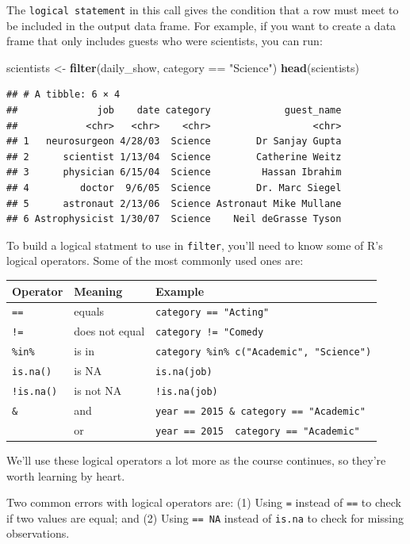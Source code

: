 \documentclass[]{book}
\makeatletter
\newenvironment{Shaded}{\begin{snugshade}}{\end{snugshade}}
\newcommand{\KeywordTok}[1]{\textcolor[rgb]{0.13,0.29,0.53}{\textbf{{#1}}}}
\newcommand{\StringTok}[1]{\textcolor[rgb]{0.31,0.60,0.02}{{#1}}}
\newcommand{\NormalTok}[1]{{#1}}
\newenvironment{kframe}{%
\medskip{}
\setlength{\fboxsep}{.8em}
 \def\at@end@of@kframe{}%
 \ifinner\ifhmode%
  \def\at@end@of@kframe{\end{minipage}}%
  \begin{minipage}{\columnwidth}%
 \fi\fi%
 \def\FrameCommand##1{\hskip\@totalleftmargin \hskip-\fboxsep
 \colorbox{shadecolor}{##1}\hskip-\fboxsep
     \hskip-\linewidth \hskip-\@totalleftmargin \hskip\columnwidth}%
 \MakeFramed {\advance\hsize-\width
   \@totalleftmargin\z@ \linewidth\hsize
   \@setminipage}}%
 {\par\unskip\endMakeFramed%
 \at@end@of@kframe}
\renewenvironment{Shaded}{\begin{kframe}}{\end{kframe}}
\newenvironment{rmdblock}[1]
  {
  \begin{itemize}
  \renewcommand{\labelitemi}{
    \raisebox{-.7\height}[0pt][0pt]{
      {\setkeys{Gin}{width=3em,keepaspectratio}\texttt{[image: images/\#1]}}
    }
  }
  \setlength{\fboxsep}{1em}
  \begin{kframe}
  \item
  }
  {
  \end{kframe}
  \end{itemize}
  }
\newenvironment{rmdwarning}
  {\begin{rmdblock}{warning}}
  {\end{rmdblock}}
\makeatother
\begin{document}
The \texttt{logical\ statement} in this call gives the condition that a
row must meet to be included in the output data frame. For example, if
you want to create a data frame that only includes guests who were
scientists, you can run:

\begin{Shaded}
\begin{Highlighting}[]
\NormalTok{scientists <-}\StringTok{ }\KeywordTok{filter}\NormalTok{(daily_show, category ==}\StringTok{ "Science"}\NormalTok{)}
\KeywordTok{head}\NormalTok{(scientists)}
\end{Highlighting}
\end{Shaded}

\begin{verbatim}
## # A tibble: 6 × 4
##              job    date category             guest_name
##            <chr>   <chr>    <chr>                  <chr>
## 1   neurosurgeon 4/28/03  Science        Dr Sanjay Gupta
## 2      scientist 1/13/04  Science        Catherine Weitz
## 3      physician 6/15/04  Science         Hassan Ibrahim
## 4         doctor  9/6/05  Science        Dr. Marc Siegel
## 5      astronaut 2/13/06  Science Astronaut Mike Mullane
## 6 Astrophysicist 1/30/07  Science    Neil deGrasse Tyson
\end{verbatim}

To build a logical statment to use in \texttt{filter}, you'll need to
know some of R's logical operators. Some of the most commonly used ones
are:

\begin{longtable}[c]{@{}lll@{}}
\toprule
Operator & Meaning & Example\tabularnewline
\midrule
\endhead
\texttt{==} & equals & \texttt{category\ ==\ "Acting"}\tabularnewline
\texttt{!=} & does not equal &
\texttt{category\ !=\ "Comedy}\tabularnewline
\texttt{\%in\%} & is in &
\texttt{category\ \%in\%\ c("Academic",\ "Science")}\tabularnewline
\texttt{is.na()} & is NA & \texttt{is.na(job)}\tabularnewline
\texttt{!is.na()} & is not NA & \texttt{!is.na(job)}\tabularnewline
\texttt{\&} & and &
\texttt{year\ ==\ 2015\ \&\ category\ ==\ "Academic"}\tabularnewline
\texttt{\textbar{}} & or &
\texttt{year\ ==\ 2015\ \textbar{}\ category\ ==\ "Academic"}\tabularnewline
\bottomrule
\end{longtable}

We'll use these logical operators a lot more as the course continues, so
they're worth learning by heart.

\begin{rmdwarning}
Two common errors with logical operators are: (1) Using \texttt{=}
instead of \texttt{==} to check if two values are equal; and (2) Using
\texttt{==\ NA} instead of \texttt{is.na} to check for missing
observations.
\end{rmdwarning}
\end{document}
